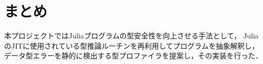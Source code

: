 
\section{まとめ} \label{section:conclusion}

本プロジェクトではJuliaプログラムの型安全性を向上させる手法として，
JuliaのJITに使用されている型推論ルーチンを再利用してプログラムを抽象解釈し，
データ型エラーを静的に検出する型プロファイラを提案し，その実装を行った．
